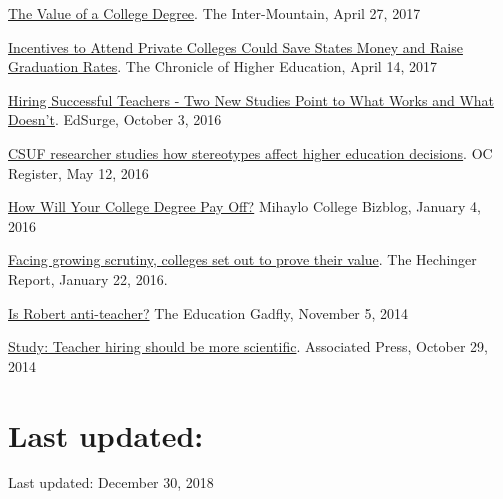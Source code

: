 \documentclass[11pt,a4paper,sans]{moderncv}
\begin{document}
\href{http://www.theintermountain.com/opinion/columnists/2017/04/the-value-of-a-college-degree/}{The Value of a College Degree}. The Inter-Mountain, April 27, 2017



\href{http://www.chronicle.com/article/Incentives-to-Attend-Private/239801?cid=at\&utm_source=at\&utm_medium=en\&elqTrackId=5719cd9ce29549cf9b399520678c52f0\&elq=c46d8f380cc14466861c12899b770d6c\&elqaid=13488\&elqat=1\&elqCampaignId=5599}{Incentives to Attend Private Colleges Could Save States Money and Raise Graduation Rates}. The Chronicle of Higher Education, April 14, 2017



\href{https://www.edsurge.com/news/2016-10-03-hiring-successful-teachers-two-new-studies-point-to-what-works-and-what-doesn-t}{Hiring Successful Teachers - Two New Studies Point to What Works and What Doesn't}. EdSurge, October 3, 2016



\href{http://www.ocregister.com/articles/college-715504-students-klein.html}{CSUF researcher studies how stereotypes affect higher education decisions}. OC Register, May 12, 2016



\href{https://bizblogs.fullerton.edu/blog/2016/01/04/how-will-your-college-degree-pay-off/}{How Will Your College Degree Pay Off?} Mihaylo College Bizblog, January 4, 2016



\href{http://hechingerreport.org/25399-2/}{Facing growing scrutiny, colleges set out to prove their value}. The Hechinger Report, January 22, 2016.



\href{https://edexcellence.net/commentary/podcasts/is-robert-anti-teacher}{Is Robert anti-teacher?} The Education Gadfly, November 5, 2014



\href{http://komonews.com/news/local/study-teacher-hiring-should-be-more-scientific}{Study: Teacher hiring should be more scientific}. Associated Press, October 29, 2014



\section{Last updated:}  
  
Last updated: December 30, 2018

\end{document}
